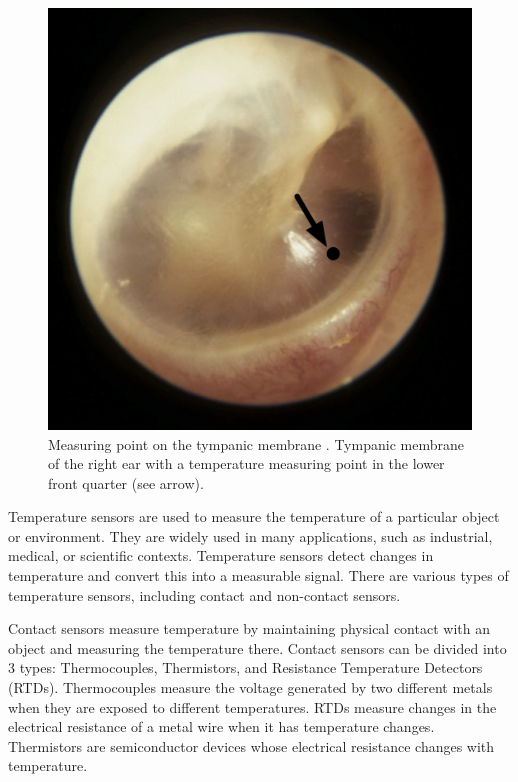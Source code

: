 \begin{figure}[t]
    \centering
    \includegraphics[scale=0.15]{thesis-doc/images/tympanic_membrane_mp.png}
    \caption{Measuring point on the tympanic membrane \cite{brinnelTympanicTemperatureCore1989}. Tympanic membrane of the right ear with a temperature measuring point in the lower front quarter (see arrow).}
    \label{fig:tympanic_membrane_mp}
\end{figure}




Temperature sensors are used to measure the temperature of a particular object or environment.
They are widely used in many applications, such as industrial, medical, or scientific contexts.
Temperature sensors detect changes in temperature and convert this into a measurable signal.
There are various types of temperature sensors, including contact and non-contact sensors.

Contact sensors measure temperature by maintaining physical contact with an object and measuring the temperature there.
Contact sensors can be divided into 3 types: Thermocouples, Thermistors, and Resistance Temperature Detectors (RTDs). 
Thermocouples measure the voltage generated by two different metals when they are exposed to different temperatures.
RTDs measure changes in the electrical resistance of a metal wire when it has temperature changes.
Thermistors are semiconductor devices whose electrical resistance changes with temperature.

